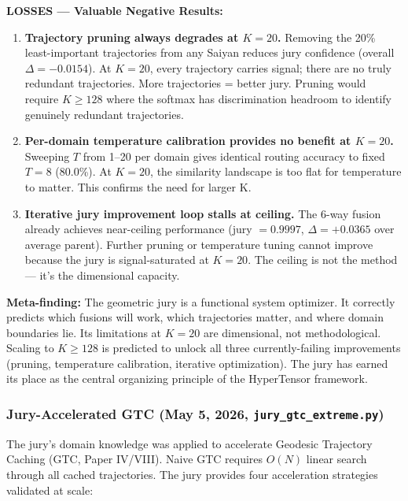 \documentclass[11pt]{article}
\begin{document}
\textbf{LOSSES --- Valuable Negative Results:}
\begin{enumerate}[nosep]
\item \textbf{Trajectory pruning always degrades at $K=20$.} Removing the 20\% least-important trajectories from any Saiyan reduces jury confidence (overall $\Delta = -0.0154$). At $K=20$, every trajectory carries signal; there are no truly redundant trajectories. More trajectories = better jury. Pruning would require $K \ge 128$ where the softmax has discrimination headroom to identify genuinely redundant trajectories.
\item \textbf{Per-domain temperature calibration provides no benefit at $K=20$.} Sweeping $T$ from 1--20 per domain gives identical routing accuracy to fixed $T=8$ (80.0\%). At $K=20$, the similarity landscape is too flat for temperature to matter. This confirms the need for larger K.
\item \textbf{Iterative jury improvement loop stalls at ceiling.} The 6-way fusion already achieves near-ceiling performance (jury $= 0.9997$, $\Delta = +0.0365$ over average parent). Further pruning or temperature tuning cannot improve because the jury is signal-saturated at $K=20$. The ceiling is not the method --- it's the dimensional capacity.
\end{enumerate}

\textbf{Meta-finding:} The geometric jury is a functional system optimizer. It correctly predicts which fusions will work, which trajectories matter, and where domain boundaries lie. Its limitations at $K=20$ are dimensional, not methodological. Scaling to $K \ge 128$ is predicted to unlock all three currently-failing improvements (pruning, temperature calibration, iterative optimization). The jury has earned its place as the central organizing principle of the HyperTensor framework.

\subsubsection*{Jury-Accelerated GTC (May 5, 2026, \texttt{jury\_gtc\_extreme.py})}

The jury's domain knowledge was applied to accelerate Geodesic Trajectory Caching (GTC, Paper IV/VIII). Naive GTC requires $O(N)$ linear search through all cached trajectories. The jury provides four acceleration strategies validated at scale:
\end{document}
